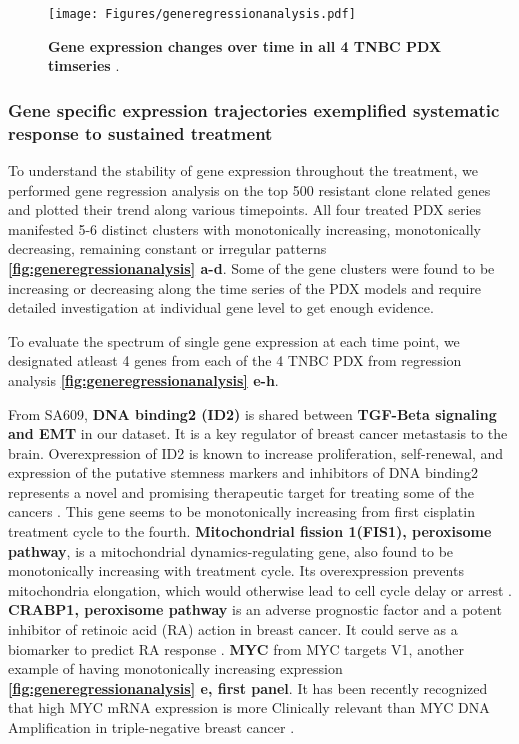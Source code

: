 \begin{figure}
\centering
 \texttt{[image: Figures/generegressionanalysis.pdf]}
	
\caption[Gene expression changes over time]
	{\small
	 \textbf{Gene expression changes over time in all 4 TNBC PDX timseries} .
	}
	\label{fig:generegressionanalysis}
\end{figure}


\subsubsection{Gene specific expression trajectories exemplified systematic response to sustained treatment}
To understand the stability of gene expression throughout the treatment, we performed gene regression analysis on the top 500 resistant clone related genes and plotted their trend along various timepoints. All four treated PDX series manifested 5-6 distinct clusters with monotonically increasing, monotonically decreasing, remaining constant or irregular patterns \textbf{\autoref{fig:generegressionanalysis} a-d}. Some of the gene clusters were found to be increasing or decreasing along the time series of the PDX models and require detailed investigation at individual gene level to get enough evidence.

To evaluate the spectrum of single gene expression at each time point, we designated atleast 4 genes from each of the 4 TNBC PDX from regression analysis \textbf{\autoref{fig:generegressionanalysis} e-h}. 

 From SA609, \textbf{ DNA binding2 (ID2)} is shared between \textbf{TGF-Beta signaling and EMT} in our dataset. It is a key regulator of breast cancer metastasis to the brain. Overexpression of ID2 is known to increase proliferation, self-renewal, and expression of the putative stemness markers and inhibitors of DNA binding2 represents a novel and promising therapeutic target for treating some of the cancers \cite{bae2017inhibitor, kijewska2019using}. This gene seems to be monotonically increasing from first cisplatin treatment cycle to the fourth. \textbf{Mitochondrial fission 1(FIS1), peroxisome pathway}, is a mitochondrial dynamics-regulating gene, also found to be monotonically increasing with treatment cycle. Its overexpression prevents mitochondria elongation, which would otherwise lead to cell cycle delay or arrest \cite{fan2015mir, anderson2018dysregulation}. \textbf{CRABP1, peroxisome pathway} is an adverse prognostic factor and a potent inhibitor of retinoic acid (RA) action in breast cancer. It could serve as a biomarker to predict RA response \cite{liu2015crabp1}. \textbf{MYC} from MYC targets V1, another example of having monotonically increasing expression \textbf{\autoref{fig:generegressionanalysis} e, first panel}. It has been recently recognized that high MYC mRNA expression is more Clinically relevant than MYC DNA Amplification in triple-negative breast cancer \cite{chen2008myc, katsuta2020high}.

